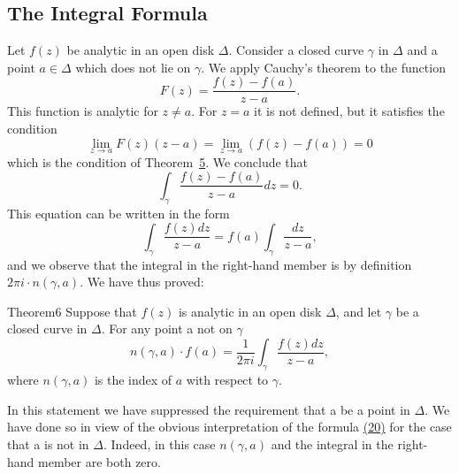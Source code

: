 \setcounter{section}{2}\setcounter{subsection}{1}\subsection{The Integral Formula}\label{sec:4.2.2}
Let $f(z)$ be analytic in an open disk $\Delta$. Consider a closed curve $\gamma$ in $\Delta$ and a point $a \in \Delta$ which does not lie on $\gamma$. We apply Cauchy's theorem to the function
\begin{equation*}
F (z) = \frac {f (z) - f (a)}{z - a}.
\end{equation*}
This function is analytic for $z \neq a$. For $z = a$ it is not defined, but it satisfies the condition
\begin{equation*}
\lim _ {z \rightarrow a} F (z) (z - a) = \lim _ {z \rightarrow a} (f (z) - f (a)) = 0
\end{equation*}
which is the condition of Theorem~\hyperref[thm:4.5]{5}. We conclude that
\begin{equation*}
\int_ {\gamma} \frac {f (z) - f (a)}{z - a} d z = 0.
\end{equation*}
This equation can be written in the form
\begin{equation*}
\int_ {\gamma} \frac {f (z) d z}{z - a} = f (a) \int_ {\gamma} \frac {d z}{z - a},
\end{equation*}
and we observe that the integral in the right-hand member is by definition $2\pi i \cdot n(\gamma, a)$. We have thus proved:

\begin{originalstatement}{Theorem}{6}\label{thm:4.6}
Suppose that $f(z)$ is analytic in an open disk $\Delta$, and let $\gamma$ be a closed curve in $\Delta$. For any point a not on $\gamma$
\begin{equation*}
n (\gamma , a) \cdot f (a) = \frac {1}{2 \pi i} \int_ {\gamma} \frac {f (z) d z}{z - a},\tag{20}\label{eq:4.20}
\end{equation*}
where $n(\gamma, a)$ is the index of $a$ with respect to $\gamma$.

\end{originalstatement}
In this statement we have suppressed the requirement that a be a point in $\Delta$. We have done so in view of the obvious interpretation of the formula \hyperref[eq:4.20]{(20)} for the case that a is not in $\Delta$. Indeed, in this case $n(\gamma,a)$ and the integral in the right-hand member are both zero.

